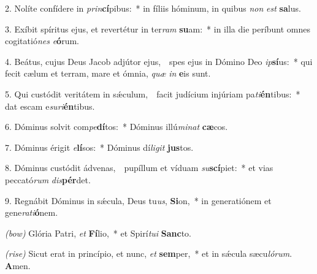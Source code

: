 2. Nolíte confídere in \textit{prin}\textbf{cí}pibus:~* in fíliis hóminum, in quibus \textit{non} \textit{est} \textbf{sa}lus.

3. Exíbit spíritus ejus, et revertétur in ter\textit{ram} \textbf{su}am:~* in illa die períbunt omnes cogitatió\textit{nes} \textit{e}\textbf{ó}rum.

4. Beátus, cujus Deus Jacob adjútor ejus,~\GreDagger\ spes ejus in Dómino Deo \textit{ip}\textbf{sí}us:~* qui fecit cælum et terram, mare et ómnia, \textit{quæ} \textit{in} \textbf{e}is sunt.

5. Qui custódit veritátem in s\'{\ae}culum,~\GreDagger\ facit judícium injúriam pa\textit{ti}\textbf{én}tibus:~* dat escam e\textit{su}\textit{ri}\textbf{én}tibus.

6. Dóminus solvit com\textit{pe}\textbf{dí}tos:~* Dóminus illú\textit{mi}\textit{nat} \textbf{cæ}cos.

7. Dóminus érigit \textit{e}\textbf{lí}sos:~* Dóminus dí\textit{li}\textit{git} \textbf{jus}tos.

8. Dóminus custódit ádvenas,~\GreDagger\ pupíllum et víduam \textit{su}\textbf{scí}piet:~* et vias peccató\textit{rum} \textit{dis}\textbf{pér}det.

9. Regnábit Dóminus in s\'{\ae}cula, Deus tu\textit{us}, \textbf{Si}on,~* in generatiónem et gene\textit{ra}\textit{ti}\textbf{ó}nem.

\textit{(bow)} Glória Patri, \textit{et} \textbf{Fí}lio,~* et Spirí\textit{tu}\textit{i} \textbf{Sanc}to.

\textit{(rise)} Sicut erat in princípio, et nunc, \textit{et} \textbf{sem}per,~* et in s\'{\ae}cula sæcu\textit{ló}\textit{rum}. \textbf{A}men.